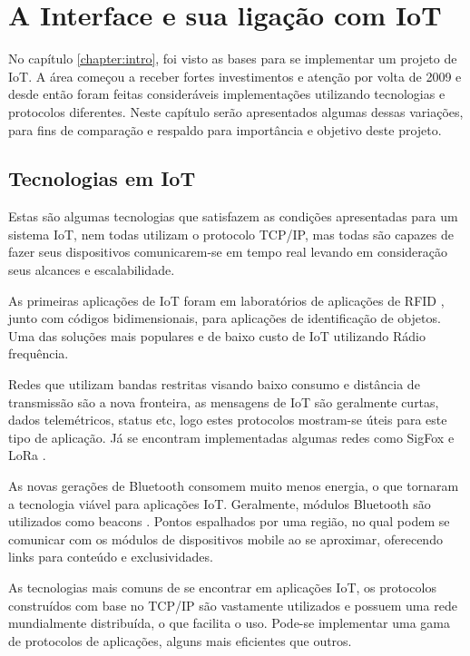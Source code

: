 \chapter{A Interface e sua ligação com IoT}
\label{chapter:interface_iot}

No capítulo \ref{chapter:intro}, foi visto as bases para se implementar um projeto de IoT. A área começou a receber fortes investimentos e atenção por volta de 2009 e desde então foram feitas consideráveis implementações utilizando tecnologias e protocolos diferentes. Neste capítulo serão apresentados algumas dessas variações, para fins de comparação e respaldo para importância e objetivo deste projeto.

\section{Tecnologias em IoT}
\label{section:tecnologias_iot}

Estas são algumas tecnologias que satisfazem as condições apresentadas para um sistema IoT, nem todas utilizam o protocolo TCP/IP, mas todas são  capazes de fazer seus dispositivos comunicarem-se em tempo real levando em consideração seus alcances e escalabilidade.

As primeiras aplicações de IoT foram em laboratórios de aplicações de RFID \cite{Rampim:iot}, junto com códigos bidimensionais, para aplicações de identificação de objetos. Uma das soluções mais populares e de baixo custo de IoT utilizando Rádio frequência.

Redes que utilizam bandas restritas visando baixo consumo e distância de transmissão são a nova fronteira, as mensagens de IoT são geralmente curtas, dados telemétricos, status etc, logo estes protocolos mostram-se úteis para este tipo de aplicação. Já se encontram implementadas algumas redes como SigFox \cite{Sigfox} e LoRa \cite{LoRa}. 

As novas gerações de Bluetooth consomem muito menos energia, o que tornaram a tecnologia viável para aplicações IoT. Geralmente, módulos Bluetooth são utilizados como beacons \cite{Endeavor:Beacons}. Pontos espalhados por uma região, no qual podem se comunicar com os módulos de dispositivos mobile ao se aproximar, oferecendo links para conteúdo e exclusividades.

As tecnologias mais comuns de se encontrar em aplicações IoT, os protocolos construídos com base no TCP/IP são vastamente utilizados e possuem uma rede mundialmente distribuída, o que facilita o uso. Pode-se implementar uma gama de protocolos de aplicações, alguns mais eficientes que outros.

